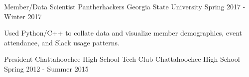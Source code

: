 

\begin{cventries}

  \cventry
    {Member/Data Scientist} %
    {Pantherhackers} %
    {Georgia State University} %
    {Spring 2017 - Winter 2017} %
    {
      \begin{cvitems} %
        \item {Used Python/C++ to collate data and visualize member demographics, event attendance, and Slack usage patterns.}
      \end{cvitems}
    }

  \cventry
    {President} %
    {Chattahoochee High School Tech Club} %
    {Chattahoochee High School} %
    {Spring 2012 - Summer 2015} %
    {
    }

\end{cventries}
